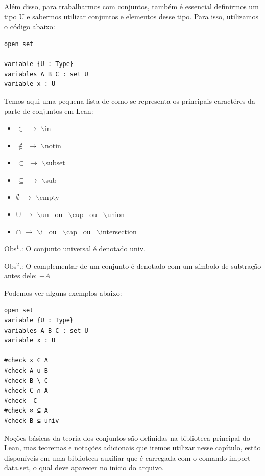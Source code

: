 Além disso, para trabalharmos com conjuntos, também é essencial definirmos um tipo {\selectfont U} e sabermos utilizar conjuntos e elementos desse tipo. Para isso, utilizamos o código abaixo:

\begin{lstlisting}
open set

variable {U : Type}
variables A B C : set U
variable x : U \end{lstlisting}

Temos aqui uma pequena lista de como se representa os principais caractéres da parte de conjuntos em Lean:

\begin{itemize}
  \item $\in$ $\rightarrow$ $\backslash$in

  \item $\notin$ $\rightarrow$ $\backslash$notin

  \item $\subset$ $\rightarrow$ $\backslash$subset

  \item $\subseteq$ $\rightarrow$ $\backslash$sub

  \item $\emptyset$ $\rightarrow$ $\backslash$empty

  \item $\cup$ $\rightarrow$ $\backslash$un \ ou \ $\backslash$cup \ ou \ $\backslash$union

  \item $\cap$ $\rightarrow$ $\backslash$i \ ou \ $\backslash$cap \ ou \ $\backslash$intersection
\end{itemize}

Obs$^{1}$.: O conjunto universal é denotado { \selectfont univ}.

Obs$^{2}$.: O complementar de um conjunto é denotado com um símbolo de subtração antes dele: $-A$

Podemos ver alguns exemplos abaixo:
\begin{lstlisting}
open set
variable {U : Type}
variables A B C : set U
variable x : U

#check x ∈ A
#check A ∪ B
#check B \ C
#check C ∩ A
#check -C
#check ∅ ⊆ A
#check B ⊆ univ \end{lstlisting}

Noções básicas da teoria dos conjuntos são definidas na biblioteca principal do Lean, mas teoremas e notações adicionais que iremos utilizar nesse capítulo, estão disponíveis em uma biblioteca auxiliar que é carregada com o comando
{ \selectfont import data.set}, o qual deve aparecer no início do arquivo.

